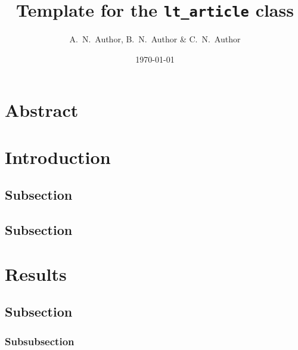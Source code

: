 \documentclass[a4paper, 11pt]{lt_article}
\title{Template for the \texttt{lt\_article} class}
\author{A.~N.~Author, B.~N.~Author \& C.~N.~Author}
\date{\today}
\begin{document}
\maketitle

\section*{Abstract} %

\blindtext

\section{Introduction} %

\Blindtext[1]

\subsection{Subsection} %

\Blindtext[3]

\subsection{Subsection} %

\Blindtext[2]


\section{Results} %

\subsection{Subsection} %

\Blindtext[1]

\subsubsection{Subsubsection}
\Blindtext[2]
\end{document}
